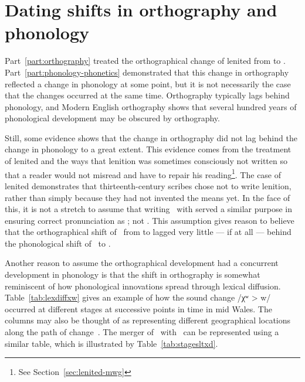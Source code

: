 \section{Dating shifts in orthography and phonology}
\label{sec:change-lenition-as}

Part~\ref{part:orthography} treated the orthographical change of lenited  from  to .  Part~\ref{part:phonology-phonetics} demonstrated that this change in orthography reflected a change in phonology at some point, but it is not necessarily the case that the changes occurred at the same time. Orthography typically lags behind phonology, and Modern English orthography shows that several hundred years of phonological development may be obscured by orthography.

Still,  some evidence shows that the change in orthography did not lag behind the change in phonology to a great extent. This evidence comes from the  treatment of lenited  and the ways that lenition was sometimes consciously not written so that a reader would not misread and have to repair his reading\footnote{See Section~\ref{sec:lenited-mwg}}. The case of lenited  demonstrates that thirteenth-century scribes chose not to write lenition, rather than simply because they had not invented the means yet. In the face of this, it is not a stretch to assume that writing \lT\ with  served a similar purpose in ensuring correct pronunciation as \lT; not \xD. This assumption gives reason to believe that the orthographical shift of \lT\ from  to  lagged very little --- if at all --- behind the phonological shift of \lT\ to \xD.

Another reason to assume the orthographical development had a concurrent development in phonology is that the shift in orthography is somewhat reminiscent of how phonological innovations spread through lexical diffusion. Table~\ref{tab:lexdiffxw} gives an example of how the sound change /χʷ > w/  occurred at different stages at successive points in time in mid Wales. The columns may also be thought of as representing different geographical locations along the path of change~\autocite{Wil_Lexical05}. The merger of \lT\ with \xD\ can be represented using a similar table, which is illustrated by Table~\ref{tab:stagesltxd}.


